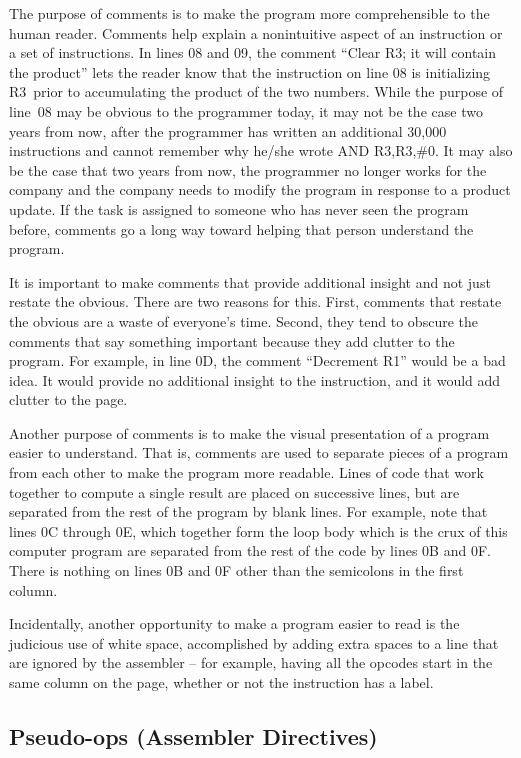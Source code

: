 \documentclass{patt}
\begin{document}
The purpose of comments is to make the program more comprehensible to
the human reader.  Comments help explain a nonintuitive aspect of an
instruction or a set of instructions.  In lines 08 and 09, the comment
``Clear R3; it will contain the product'' lets the reader know that
the instruction on line 08 is initializing R3~prior to accumulating
the product of the two numbers.  While the purpose of line~08 may be
obvious to the programmer today, it may not be the case two years from
now, after the programmer has written an additional 30,000 instructions
and cannot remember why he/she wrote AND R3,R3,\#0.  It may also
be the case that two years from now, the programmer no longer works
for the company and the company needs to modify the program in
response to a product update.  If the task is assigned to someone who
has never seen the program before, comments go a long way toward
helping that person understand the program.

It is important to make comments that provide additional insight and
not just restate the obvious.  There are two reasons for this.  First,
comments that restate the obvious are a waste of everyone's time. \lightbulb[-11pt]
Second, they tend to obscure the comments that say something important
because they add clutter to the program.  For example, in line 0D, the
comment ``Decrement R1'' would be a bad idea.  It would provide no
additional insight to the instruction, and it would add clutter to the
page.

Another purpose of comments is to make the visual presentation of a program
easier to understand.  That is, comments are used to separate
pieces of a program from each other to make the program more
readable.  Lines of code that work together to compute a
single result are placed on successive lines, but are separated from the rest
of the program by blank lines.
For example, note that lines 0C through 0E, which together form the
loop body which is the crux of this computer program are separated 
from the rest of the code by lines 0B and 0F.  There is nothing on 
lines 0B and 0F other than the semicolons in the first column.

Incidentally, another opportunity to make a program easier to read
is the judicious use of white space, accomplished by adding extra spaces
to a line that are ignored by the assembler -- for example, having all the 
opcodes start in the same column on the page, whether or not the instruction
has a label.

\subsection{Pseudo-ops (Assembler Directives)}
\end{document}
